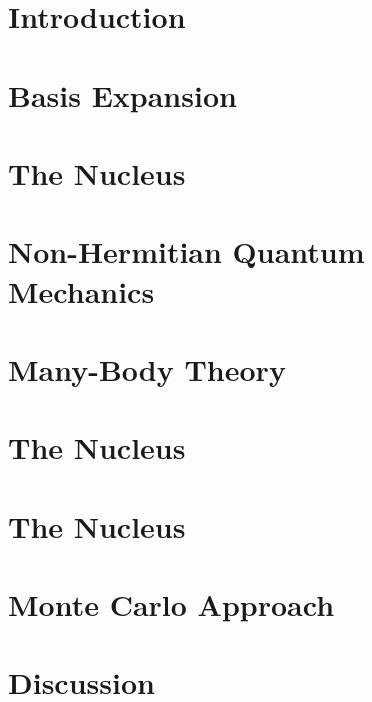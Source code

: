 \documentclass[12pt,a4paper]{report}
\begin{document}

\tableofcontents
\newpage

\setcounter{page}{1}

\chapter{Introduction}
\label{cha:introduction}



\chapter{Basis Expansion}
\label{cha:basis expansion}


\chapter{The  Nucleus}
\label{cha:he5}


\chapter{Non-Hermitian Quantum Mechanics} 
\label{cha:nhqm}


\chapter{Many-Body Theory}
\label{cha:many-body}

%

\chapter{The  Nucleus}
\label{cha:he6}


\chapter{The  Nucleus}
\label{cha:he7}

\chapter{Monte Carlo Approach}
\label{cha:monte carlo}


\chapter{Discussion}
\label{cha:disc}

\end{document}
